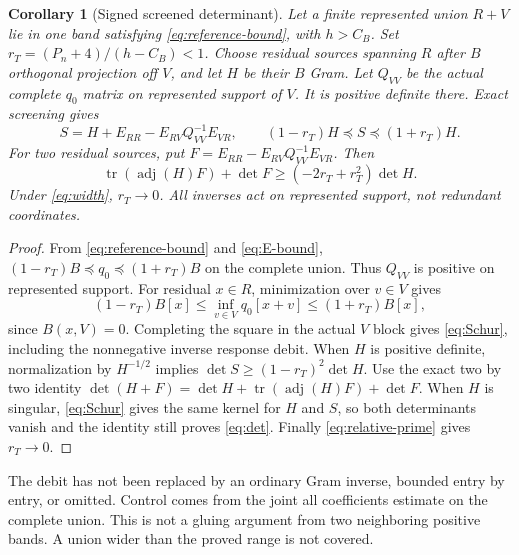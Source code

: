 \documentclass[11pt]{article}
\newtheorem{corollary}[theorem]{Corollary}
\theoremstyle{remark}
\newcommand{\adj}{\operatorname{adj}}
\begin{document}
\begin{corollary}[Signed screened determinant]\label{cor:schur}
Let a finite represented union $R+V$ lie in one band satisfying
\eqref{eq:reference-bound}, with $h>C_B$. Set
$r_T=(P_n+4)/(h-C_B)<1$.
Choose residual sources spanning $R$ after $B$ orthogonal projection
off $V$, and let $H$ be their $B$ Gram.
Let $Q_{VV}$ be the actual complete $q_0$ matrix on represented support
of $V$. It is positive definite there. Exact screening gives
\begin{equation}\label{eq:Schur}
 S=H+E_{RR}-E_{RV}Q_{VV}^{-1}E_{VR},\qquad
 (1-r_T)H\preceq S\preceq(1+r_T)H.
\end{equation}
For two residual sources, put
$F=E_{RR}-E_{RV}Q_{VV}^{-1}E_{VR}$. Then
\begin{equation}\label{eq:det}
 \operatorname{tr}(\adj(H)F)+\det F
                   \ge(-2r_T+r_T^2)\det H.
\end{equation}
Under \eqref{eq:width}, $r_T\to0$.
All inverses act on represented support, not redundant coordinates.
\end{corollary}
\begin{proof}
From \eqref{eq:reference-bound} and \eqref{eq:E-bound},
$(1-r_T)B\preceq q_0\preceq(1+r_T)B$ on the complete union.
Thus $Q_{VV}$ is positive on represented support.
For residual $x\in R$, minimization over $v\in V$ gives
\[
 (1-r_T)B[x]\le\inf_{v\in V}q_0[x+v]\le(1+r_T)B[x],
\]
since $B(x,V)=0$.
Completing the square in the actual $V$ block gives \eqref{eq:Schur},
including the nonnegative inverse response debit.
When $H$ is positive definite, normalization by $H^{-1/2}$ implies
$\det S\ge(1-r_T)^2\det H$.
Use the exact two by two identity
$\det(H+F)=\det H+\operatorname{tr}(\adj(H)F)+\det F$.
When $H$ is singular, \eqref{eq:Schur} gives the same kernel for $H$
and $S$, so both determinants vanish and the identity still proves
\eqref{eq:det}. Finally \eqref{eq:relative-prime} gives $r_T\to0$.
\end{proof}

The debit has not been replaced by an ordinary Gram inverse, bounded
entry by entry, or omitted. Control comes from the joint all coefficients
estimate on the complete union. This is not a gluing argument from two
neighboring positive bands. A union wider than the proved range is not
covered.
\end{document}
